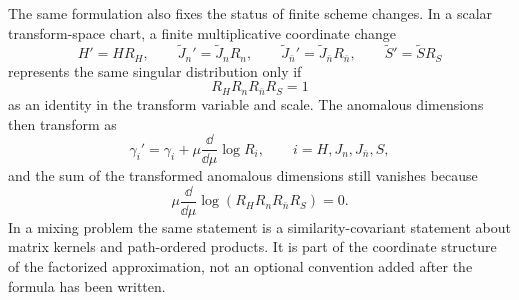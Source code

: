 \begin{controlledapproximation}
The same formulation also fixes the status of finite scheme changes.  In a
scalar transform-space chart, a finite multiplicative coordinate change
\begin{equation}
  H'=H R_H,\qquad
  \widetilde J_n'=\widetilde J_n R_n,\qquad
  \widetilde J_{\bar n}'=\widetilde J_{\bar n} R_{\bar n},\qquad
  \widetilde S'=\widetilde S R_S
  \label{eq:scet-finite-multiplicative-scheme-change}
\end{equation}
represents the same singular distribution only if
\begin{equation}
  R_H R_n R_{\bar n} R_S=1
  \label{eq:scet-finite-scheme-product-condition}
\end{equation}
as an identity in the transform variable and scale.  The anomalous dimensions
then transform as
\begin{equation}
  \gamma_i'
  =
  \gamma_i+\mu\frac{\dd}{\dd\mu}\log R_i,
  \qquad i=H,J_n,J_{\bar n},S,
  \label{eq:scet-finite-scheme-gamma-shift}
\end{equation}
and the sum of the transformed anomalous dimensions still vanishes because
\[
  \mu\frac{\dd}{\dd\mu}\log(R_HR_nR_{\bar n}R_S)=0 .
\]
In a mixing problem the same statement is a similarity-covariant statement
about matrix kernels and path-ordered products.  It is part of the coordinate
structure of the factorized approximation, not an optional convention added after
the formula has been written.
\end{controlledapproximation}

